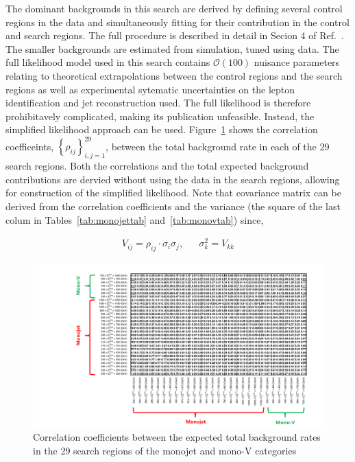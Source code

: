 The dominant backgrounds in this search are derived by defining several control regions in the data and simultaneously fitting for their contribution 
in the control and search regions. The full procedure is described in detail in Secion 4 of Ref.~\cite{CMS-PAS-EXO-16-037}. The smaller backgrounds are estimated from 
simulation, tuned using data. The full likelihood model used in this search contains $\mathcal{O}(100)$ nuisance parameters relating to theoretical 
extrapolations between the control regions and the search regions as well as experimental sytematic uncertainties on 
the lepton identification and jet reconstruction used. The full likelihood is therefore prohibitavely complicated, making its publication unfeasible. 
Instead, the simplified likelihood approach can be used. Figure~\ref{fig:fullcovariance} shows the correlation coefficeints, $\left\{\rho_{ij}\right\}_{i,j=1}^{29}$, between the total background 
rate in each of the 29 search regions. Both the correlations and the total expected background contributions are dervied without using the data in the 
search regions, allowing for construction of the simplified likelihood. Note that covariance matrix can be derived from the correlation coefficients and 
the variance (the square of the last colum in Tables~\ref{tab:monojettab} and~\ref{tab:monovtab}) since, 

\begin{align}
V_{ij} = \rho_{ij}\cdot\sigma_{i}\sigma_{j}, &&  \sigma_{k}^{2}=V_{kk}
\end{align}


\begin{figure}[hbt!]
  \begin{center} 
   \includegraphics[width=2.6\cmsFigWidth]{figures/big_corr.pdf}
\caption{Correlation coefficients between the expected total background rates in the 29 search regions of the monojet and mono-V categories}
   \label{fig:fullcovariance} 
  \end{center}
\end{figure}


